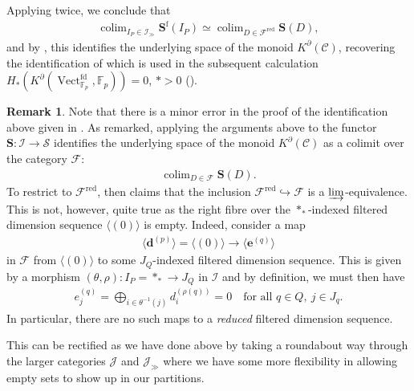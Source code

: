 \documentclass[12pt, reqno]{amsart}
\theoremstyle{plain}
\theoremstyle{definition}
\newtheorem{remark}[theorem]{Remark}
\newcommand{\F}{\mathbb F}
\begin{document}
Applying \cite[3.3.4.6]{LurieHTT} twice, we conclude that
\begin{align*}
\mathop{\operatorname{colim}}_{I_P\in \mathcal{I}_\gg} \mathbf{S}^{\operatorname{f}}(I_P)\simeq \mathop{\operatorname{colim}}_{D\in \mathcal{F}^{\operatorname{red}}} \mathbf{S}(D),
\end{align*}
and by , this identifies the underlying space of the monoid $K^\partial(\mathcal{C})$, recovering the identification of \cite[\S 5.2]{Yuan} which is used in the subsequent calculation $H_*(K^\partial(\operatorname{Vect}_{\F_p}^{\operatorname{fd}}, \F_p))=0$, $*>0$ (\cite[Theorem 5.2]{Yuan}).

\begin{remark}\label{Fred in F not cofinal}
Note that there is a minor error in the proof of the identification above given in \cite{Yuan}. As remarked, applying the arguments above to the functor $\mathbf{S}\colon \mathcal{I}\rightarrow \mathcal{S}$ identifies the underlying space of the monoid $K^\partial(\mathcal{C})$ as a colimit over the category $\mathcal{F}$:
\begin{align*}
\mathop{\operatorname{colim}}_{D\in \mathcal{F}} \mathbf{S}(D).
\end{align*}
To restrict to $\mathcal{F}^{\operatorname{red}}$,  \cite[Lemma 5.14]{Yuan} then claims that the inclusion $\mathcal{F}^{\operatorname{red}}\hookrightarrow \mathcal{F}$ is a $\varinjlim$-equivalence. This is not, however, quite true as the right fibre over the $\ast_\ast$-indexed filtered dimension sequence $\langle (0)\rangle$ is empty. Indeed, consider a map
\begin{align*}
\langle\mathbf{d}^{(p)}\rangle =\langle(0)\rangle \longrightarrow \langle \mathbf{e}^{(q)}\rangle
\end{align*}
in $\mathcal{F}$ from $\langle (0)\rangle$ to some $J_Q$-indexed filtered dimension sequence. This is given by a morphism $(\theta, \rho) \colon I_P=\ast_\ast\rightarrow J_Q$ in $\mathcal{I}$ and by definition, we must then have
\begin{align*}
e_j^{(q)}=\bigoplus_{i\in \theta^{-1}(j)} d_i^{(\rho(q))} = 0 \quad \text{for all }q\in Q,\ j\in J_q.
\end{align*}
In particular, there are no such maps to a \textit{reduced} filtered dimension sequence.

This can be rectified as we have done above by taking a roundabout way through the larger categories $\mathcal{J}$ and $\mathcal{J}_\gg$ where we have some more flexibility in allowing empty sets to show up in our partitions.
\end{remark}
\end{document}
